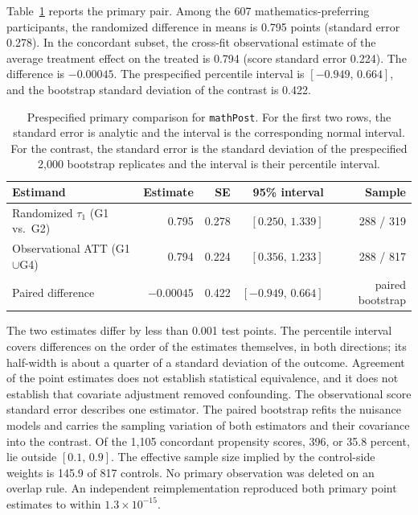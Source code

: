 \documentclass[twoside,11pt]{article}
\begin{document}
Table~\ref{tab:primary} reports the primary pair. Among the 607 mathematics-preferring participants, the randomized difference in means is 0.795 points (standard error 0.278). In the concordant subset, the cross-fit observational estimate of the average treatment effect on the treated is 0.794 (score standard error 0.224). The difference is $-0.00045$. The prespecified percentile interval is $[-0.949,\,0.664]$, and the bootstrap standard deviation of the contrast is 0.422.

\begin{table}[htbp]
\centering
\caption{Prespecified primary comparison for \texttt{mathPost}. For the first two rows, the standard error is analytic and the interval is the corresponding normal interval. For the contrast, the standard error is the standard deviation of the prespecified 2{,}000 bootstrap replicates and the interval is their percentile interval.}
\label{tab:primary}
\begin{tabular}{lrrrr}
\toprule
Estimand & Estimate & SE & 95\% interval & Sample \\
\midrule
Randomized $\tau_1$ (G1 vs.\ G2) & 0.795 & 0.278 & $[0.250,\,1.339]$ & 288 / 319 \\
Observational ATT (G1$\cup$G4) & 0.794 & 0.224 & $[0.356,\,1.233]$ & 288 / 817 \\
Paired difference & $-0.00045$ & 0.422 & $[-0.949,\,0.664]$ & paired bootstrap \\
\bottomrule
\end{tabular}
\end{table}

The two estimates differ by less than 0.001 test points. The percentile interval covers differences on the order of the estimates themselves, in both directions; its half-width is about a quarter of a standard deviation of the outcome. Agreement of the point estimates does not establish statistical equivalence, and it does not establish that covariate adjustment removed confounding. The observational score standard error describes one estimator. The paired bootstrap refits the nuisance models and carries the sampling variation of both estimators and their covariance into the contrast. Of the 1{,}105 concordant propensity scores, 396, or 35.8 percent, lie outside $[0.1,\,0.9]$. The effective sample size implied by the control-side weights is 145.9 of 817 controls. No primary observation was deleted on an overlap rule. An independent reimplementation reproduced both primary point estimates to within $1.3\times 10^{-15}$.
\end{document}

